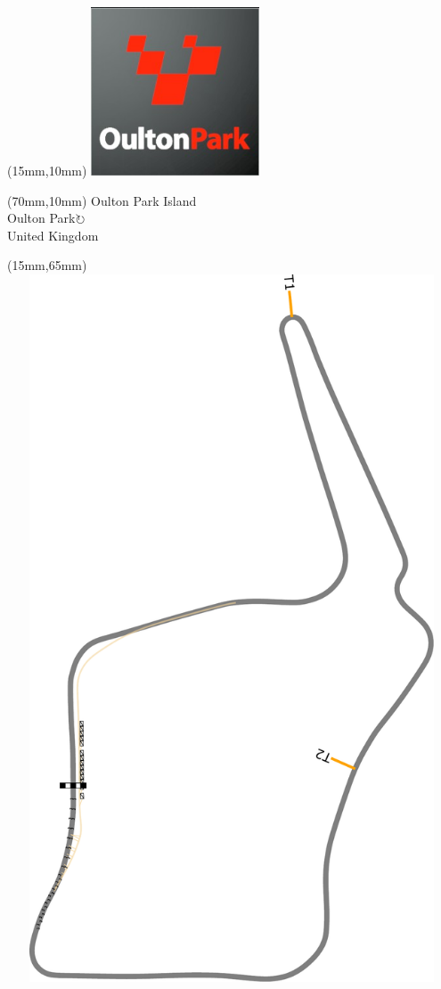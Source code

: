 \null\newpage
\begin{textblock*}{50mm}(15mm,10mm)%
\includegraphics[width=50mm]{LG/2015-05-20_00091.png}
\end{textblock*}
\begin{textblock*}{130mm}(70mm,10mm)%
{\fontsize{20}{20}\selectfont Oulton Park Island\\}
{\fontsize{16}{16}\selectfont Oulton Park\hfill \Large$\circlearrowright$\\}
{\fontsize{12}{12}\selectfont United Kingdom\\}
\end{textblock*}
\begin{textblock*}{185mm}(15mm,65mm)%
\centering
\mbox{\includegraphics[width=185mm,height=210mm,keepaspectratio]{PT/OUPAIS.pdf}}
\end{textblock*}
